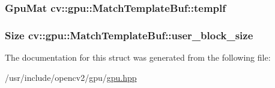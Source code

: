 \hypertarget{structcv_1_1gpu_1_1MatchTemplateBuf_ab0a5afc2f6a35edcf453fd77f878d596}{
\subsubsection[{templf}]{\setlength{\rightskip}{0pt plus 5cm}Gpu\-Mat cv\-::gpu\-::\-Match\-Template\-Buf\-::templf}}\label{structcv_1_1gpu_1_1MatchTemplateBuf_ab0a5afc2f6a35edcf453fd77f878d596}
\hypertarget{structcv_1_1gpu_1_1MatchTemplateBuf_a3224af1c66c84536181d5bcdd9007339}{
\subsubsection[{user\-\_\-block\-\_\-size}]{\setlength{\rightskip}{0pt plus 5cm}Size cv\-::gpu\-::\-Match\-Template\-Buf\-::user\-\_\-block\-\_\-size}}\label{structcv_1_1gpu_1_1MatchTemplateBuf_a3224af1c66c84536181d5bcdd9007339}


The documentation for this struct was generated from the following file\-:\begin{DoxyCompactItemize}
\item 
/usr/include/opencv2/gpu/\hyperlink{gpu_2gpu_8hpp}{gpu.\-hpp}\end{DoxyCompactItemize}

